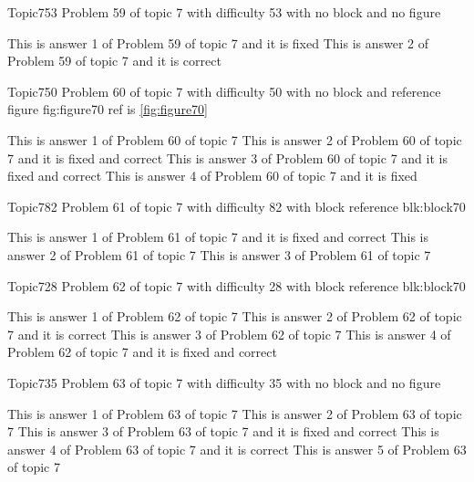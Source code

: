 \documentclass[master]{exam}
\begin{document}
\begin{problem}{Topic7}{53}
	Problem 59 of topic 7 with difficulty 53 with no block and no figure
	\begin{answers}
		\answer[fixed] This is answer 1 of Problem 59 of topic 7 and it is fixed
		\answer[correct] This is answer 2 of Problem 59 of topic 7 and it is correct
	\end{answers}
\end{problem}

\begin{problem}{Topic7}{50}
	Problem 60 of topic 7 with difficulty 50 with no block and reference figure fig:figure70 ref is \ref{fig:figure70}
	\begin{answers}
		\answer This is answer 1 of Problem 60 of topic 7 
		 This is answer 2 of Problem 60 of topic 7 and it is fixed and correct
		 This is answer 3 of Problem 60 of topic 7 and it is fixed and correct
		\answer[fixed] This is answer 4 of Problem 60 of topic 7 and it is fixed
	\end{answers}
\end{problem}

\begin{problem}[requires=blk:block70]{Topic7}{82}
	Problem 61 of topic 7 with difficulty 82 with block reference blk:block70
	\begin{answers}
		 This is answer 1 of Problem 61 of topic 7 and it is fixed and correct
		\answer This is answer 2 of Problem 61 of topic 7 
		\answer This is answer 3 of Problem 61 of topic 7 
	\end{answers}
\end{problem}

\begin{problem}[requires=blk:block70]{Topic7}{28}
	Problem 62 of topic 7 with difficulty 28 with block reference blk:block70
	\begin{answers}
		\answer This is answer 1 of Problem 62 of topic 7 
		\answer[correct] This is answer 2 of Problem 62 of topic 7 and it is correct
		\answer This is answer 3 of Problem 62 of topic 7 
		 This is answer 4 of Problem 62 of topic 7 and it is fixed and correct
	\end{answers}
\end{problem}

\begin{problem}{Topic7}{35}
	Problem 63 of topic 7 with difficulty 35 with no block and no figure
	\begin{answers}
		\answer This is answer 1 of Problem 63 of topic 7 
		\answer This is answer 2 of Problem 63 of topic 7 
		 This is answer 3 of Problem 63 of topic 7 and it is fixed and correct
		\answer[correct] This is answer 4 of Problem 63 of topic 7 and it is correct
		\answer This is answer 5 of Problem 63 of topic 7 
	\end{answers}
\end{problem}
\end{document}
